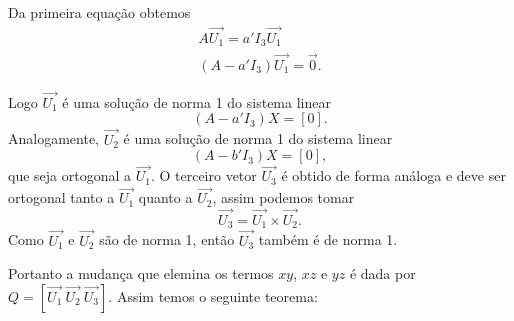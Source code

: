 Da primeira equação obtemos
\begin{align*}
    A\vec{U_1} = a'I_3\vec{U_1} \\
    (A - a'I_3)\vec{U_1} = \vec{0}.
\end{align*}

Logo $\vec{U_1}$ é uma solução de norma 1 do sistema linear
\[
    (A - a'I_3)X = [0].
\]
Analogamente, $\vec{U_2}$ é uma solução de norma 1 do sistema linear
\[
    (A - b'I_3)X = [0],
\]
que seja ortogonal a $\vec{U_1}$. O terceiro vetor $\vec{U_3}$ é obtido de forma análoga e deve ser ortogonal tanto a $\vec{U_1}$ quanto a $\vec{U_2}$, assim podemos tomar
\[
    \vec{U_3} = \vec{U_1}\times\vec{U_2}.
\]
Como $\vec{U_1}$ e $\vec{U_2}$ são de norma 1, então $\vec{U_3}$ também é de norma 1.

Portanto a mudança que elemina os termos $xy$, $xz$ e $yz$ é dada por $Q = [\vec{U_1}\ \vec{U_2}\ \vec{U_3}]$. Assim temos o seguinte teorema:

